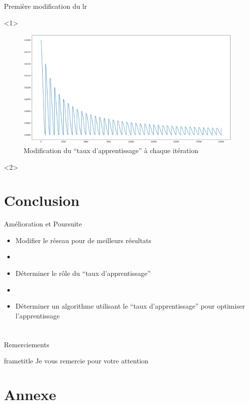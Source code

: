\documentclass{beamer}
\begin{document}
\begin{frame}[t]{Première modification du lr}
  \begin{onlyenv}<1>
    \begin{figure}
      \begin{center}
        \includegraphics[scale=0.17]{annex/lr_modification}
        \caption{Modification du ``taux d'apprentissage'' à chaque itération}
        \label{ModLR}
      \end{center}
    \end{figure}
  \end{onlyenv}
  \begin{onlyenv}<2>

  \end{onlyenv}
\end{frame}

\section*{Conclusion}

\begin{frame}[t]{Amélioration et Poursuite}
  \begin{itemize}
    \item Modifier le réseau pour de meilleurs résultats
    \item[]
    \item Déterminer le rôle du ``taux d'apprentissage''
    \item[]
    \item Déterminer un algorithme utilisant le ``taux d'apprentissage'' pour optimiser l'apprentissage
  \end{itemize}
\end{frame}

\section*{}

\begin{frame}{Remerciements}
  \begin{beamercolorbox}[ht=2.5ex,dp=1.5ex,center]{frametitle}
    Je vous remercie pour votre attention
  \end{beamercolorbox}
\end{frame}

\appendix

\section*{Annexe}
\end{document}
